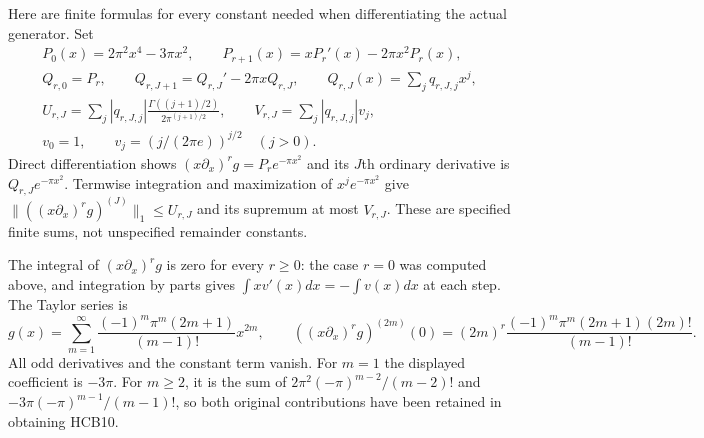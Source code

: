 Here are finite formulas for every constant needed when differentiating
the actual generator. Set
\begin{equation}\tag{HCB9}
\begin{gathered}
 P_0(x)=2\pi^2x^4-3\pi x^2,\qquad
 P_{r+1}(x)=xP_r'(x)-2\pi x^2P_r(x),\\
 Q_{r,0}=P_r,\qquad Q_{r,J+1}=Q_{r,J}'-2\pi xQ_{r,J},\qquad
 Q_{r,J}(x)=\sum_j q_{r,J,j}x^j,\\
 U_{r,J}=\sum_j|q_{r,J,j}|
       \frac{\Gamma((j+1)/2)}{2\pi^{(j+1)/2}},\qquad
 V_{r,J}=\sum_j|q_{r,J,j}|v_j,\\
 v_0=1,\qquad v_j=(j/(2\pi e))^{j/2}\quad(j>0).
\end{gathered}
\end{equation}
Direct differentiation shows $(x\partial_x)^rg=P_re^{-\pi x^2}$
and its $J$th ordinary derivative is $Q_{r,J}e^{-\pi x^2}$.
Termwise integration and maximization of $x^je^{-\pi x^2}$ give
$\|((x\partial_x)^rg)^{(J)}\|_1\leq U_{r,J}$ and its supremum
at most $V_{r,J}$. These are specified finite sums, not unspecified
remainder constants.

The integral of $(x\partial_x)^r g$ is zero for every $r\geq0$:
the case $r=0$ was computed above, and integration by parts gives
$\int x v'(x)dx=-\int v(x)dx$ at each step. The Taylor series is
\begin{equation}\tag{HCB10}
 g(x)=\sum_{m=1}^{\infty}
       \frac{(-1)^m\pi^m(2m+1)}{(m-1)!}x^{2m},\qquad
 ((x\partial_x)^rg)^{(2m)}(0)
       =(2m)^r\frac{(-1)^m\pi^m(2m+1)(2m)!}{(m-1)!}.
\end{equation}
All odd derivatives and the constant term vanish. For $m=1$ the
displayed coefficient is $-3\pi$. For $m\geq2$, it is the sum of
$2\pi^2(-\pi)^{m-2}/(m-2)!$ and
$-3\pi(-\pi)^{m-1}/(m-1)!$, so both original contributions have
been retained in obtaining HCB10.

